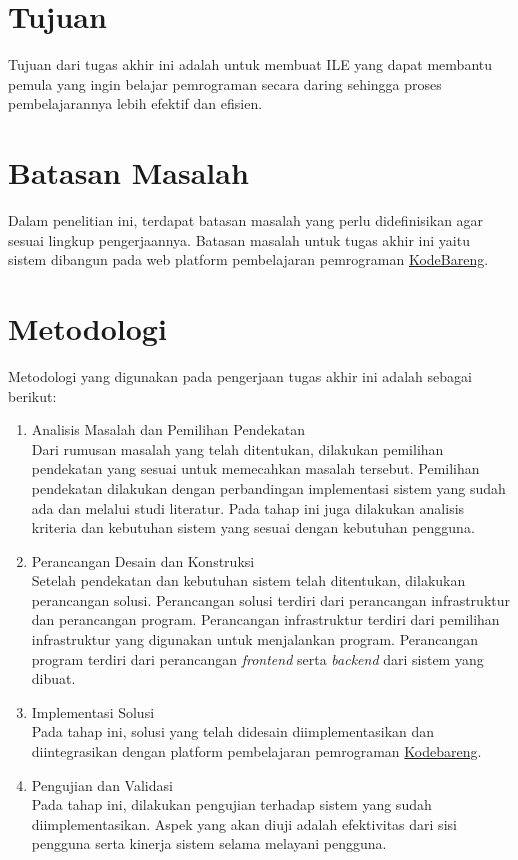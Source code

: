 \section{Tujuan}
Tujuan dari tugas akhir ini adalah untuk membuat ILE yang dapat membantu pemula yang ingin belajar pemrograman secara daring sehingga proses pembelajarannya lebih efektif dan efisien.

\section{Batasan Masalah}
Dalam penelitian ini, terdapat batasan masalah yang perlu didefinisikan agar sesuai lingkup pengerjaannya. Batasan masalah untuk tugas akhir ini yaitu sistem dibangun pada web platform pembelajaran pemrograman \href{https://kodebareng.id}{KodeBareng}.

\section{Metodologi}
Metodologi yang digunakan pada pengerjaan tugas akhir ini adalah sebagai berikut:

\begin{enumerate}
    \item Analisis Masalah dan Pemilihan Pendekatan \\
          Dari rumusan masalah yang telah ditentukan, dilakukan pemilihan pendekatan yang sesuai untuk memecahkan masalah tersebut. Pemilihan pendekatan dilakukan dengan perbandingan implementasi sistem yang sudah ada dan melalui studi literatur. Pada tahap ini juga dilakukan analisis kriteria dan kebutuhan sistem yang sesuai dengan kebutuhan pengguna.
    \item Perancangan Desain dan Konstruksi \\
          Setelah pendekatan dan kebutuhan sistem telah ditentukan, dilakukan perancangan solusi. Perancangan solusi terdiri dari perancangan infrastruktur dan perancangan program. Perancangan infrastruktur terdiri dari pemilihan infrastruktur yang digunakan untuk menjalankan program. Perancangan program terdiri dari perancangan \textit{frontend} serta \textit{backend} dari sistem yang dibuat.
    \item Implementasi Solusi \\
          Pada tahap ini, solusi yang telah didesain diimplementasikan dan diintegrasikan dengan platform pembelajaran pemrograman \href{https://kodebareng.id}{Kodebareng}.
    \item Pengujian dan Validasi \\
          Pada tahap ini, dilakukan pengujian terhadap sistem yang sudah diimplementasikan. Aspek yang akan diuji adalah efektivitas dari sisi pengguna serta kinerja sistem selama melayani pengguna.
\end{enumerate}

